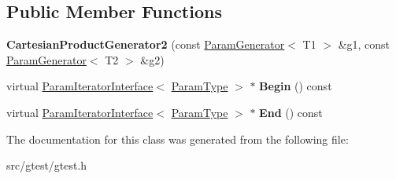 \subsection*{Public Member Functions}
\begin{DoxyCompactItemize}
\item 
\mbox{\label{classtesting_1_1internal_1_1_cartesian_product_generator2_a971ef5a45783db277f5fae84eaef41a3}} 
{\bfseries Cartesian\+Product\+Generator2} (const \mbox{\hyperlink{classtesting_1_1internal_1_1_param_generator}{Param\+Generator}}$<$ T1 $>$ \&g1, const \mbox{\hyperlink{classtesting_1_1internal_1_1_param_generator}{Param\+Generator}}$<$ T2 $>$ \&g2)
\item 
\mbox{\label{classtesting_1_1internal_1_1_cartesian_product_generator2_a404ef0c53d9b616c8b4635b8e364bc7c}} 
virtual \mbox{\hyperlink{classtesting_1_1internal_1_1_param_iterator_interface}{Param\+Iterator\+Interface}}$<$ \mbox{\hyperlink{classstd_1_1tr1_1_1tuple}{Param\+Type}} $>$ $\ast$ {\bfseries Begin} () const
\item 
\mbox{\label{classtesting_1_1internal_1_1_cartesian_product_generator2_ad0843538562029fbc55c49928a0f6e44}} 
virtual \mbox{\hyperlink{classtesting_1_1internal_1_1_param_iterator_interface}{Param\+Iterator\+Interface}}$<$ \mbox{\hyperlink{classstd_1_1tr1_1_1tuple}{Param\+Type}} $>$ $\ast$ {\bfseries End} () const
\end{DoxyCompactItemize}


The documentation for this class was generated from the following file\+:\begin{DoxyCompactItemize}
\item 
src/gtest/gtest.\+h\end{DoxyCompactItemize}
